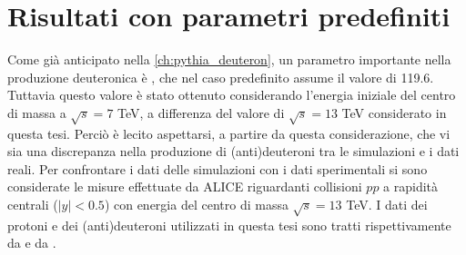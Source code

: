 \section{Risultati con parametri predefiniti}\label{ch:default}
Come già anticipato nella \autoref{ch:pythia_deuteron}, un parametro importante nella produzione deuteronica è , che nel caso predefinito assume il valore di 119.6.
Tuttavia questo valore è stato ottenuto considerando l'energia iniziale del centro di massa a $\sqrt{s} = 7$ TeV, a differenza del valore di $\sqrt s = 13$ TeV considerato in questa tesi.
Perciò è lecito aspettarsi, a partire da questa considerazione, che vi sia una discrepanza nella produzione di (anti)deuteroni tra le simulazioni e i dati reali.
Per confrontare i dati delle simulazioni con i dati sperimentali si sono considerate le misure effettuate da ALICE riguardanti collisioni $pp$ a rapidità centrali ($|y|<0.5$) con energia del centro di massa $\sqrt s = 13$ TeV.
I dati dei protoni e dei (anti)deuteroni utilizzati in questa tesi sono tratti rispettivamente da \cite{ALICE:2020jsh} e da \cite{ALICE:2020foi}.\\

